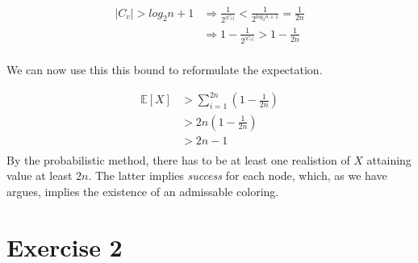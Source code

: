 \documentclass[a4paper,german]{article}
\begin{document}
\begin{align*}
|C_v| > log_2n + 1 &\Rightarrow \frac{1}{{2}^{|C_v|}} < \frac{1}{{2}^{log_2n + 1}} = \frac{1}{2n}\\
&\Rightarrow 1 - \frac{1}{{2}^{|C_v|}} > 1 - \frac{1}{2n} \\
\end{align*}

We can now use this this bound to reformulate the expectation.

\begin{align*} \mathbb{E}[X] &> \sum_{i=1}^{2n}  (1 - \frac{1}{2n})  \\
&> 2n(1 - \frac{1}{2n} ) \\
&> 2n - 1 \\
\end{align*}
By the probabilistic method, there has to be at least one realistion of \(X\) attaining value at least \(2n\).  The latter implies \emph{success} for each node, which, as we have argues, implies the existence of an admissable coloring.

\section*{Exercise 2}
\end{document}
